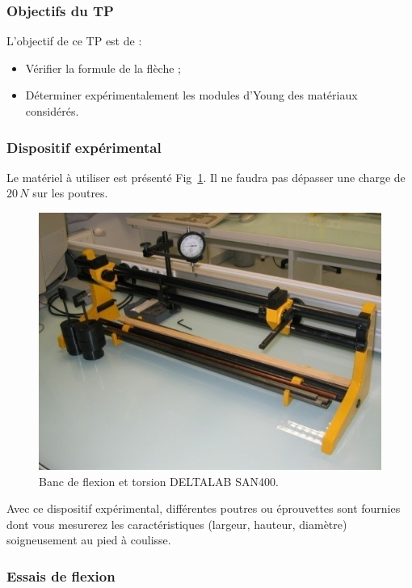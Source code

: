 \documentclass[lecture.tex]{subfiles}
\begin{document}
\subsubsection{Objectifs du TP}

L'objectif de ce TP est de :
\begin{itemize}[label =, font =\tiny ]
\item Vérifier la formule de la flèche ;
\item Déterminer expérimentalement les modules d'Young des matériaux considérés.
\end{itemize}

\subsubsection{Dispositif expérimental}
Le matériel à utiliser est présenté Fig~\ref{Fig_BancFlex}. Il ne faudra pas dépasser une charge de $20\,N$ sur les poutres.
\begin{figure}[h!]
\centering
\includegraphics[scale=1]{Img_BancFlexion.jpg}
\caption{Banc de flexion et torsion DELTALAB SAN400.}
\label{Fig_BancFlex}
\end{figure}
Avec ce dispositif expérimental, différentes poutres ou éprouvettes sont fournies dont vous mesurerez les caractéristiques (largeur, hauteur, diamètre) soigneusement au pied à coulisse.

\subsubsection{Essais de flexion}
\end{document}
